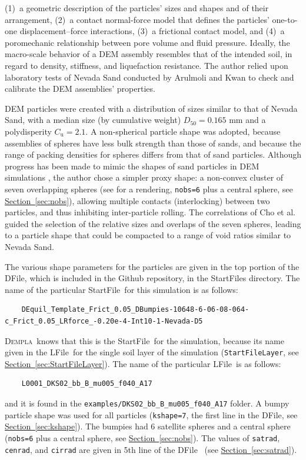 \documentclass[letterpaper,11pt]{article}
\newcommand{\Dempla}{\textsc{Dempla}}
\newcommand{\StartFile}{\textsf{StartFile}}
\newcommand{\DFile}{\textsf{DFile}}
\newcommand{\LFile}{\textsf{LFile}}
\begin{document}
(1)~a geometric description
of the particles' sizes and shapes and of their arrangement,
(2)~a contact normal-force model that defines the particles' one-to-one
displacement--force
interactions,
(3)~a frictional contact model, and
(4)~a poromechanic relationship
between pore volume and fluid pressure.
Ideally, the macro-scale behavior of a DEM assembly resembles
that of the intended soil, in regard to density, stiffness,
and liquefaction resistance.
The author relied upon laboratory tests of Nevada Sand conducted 
by Arulmoli \cite{Arulmoli1992a}
and Kwan \cite{Kwan:2015a}
to check and calibrate the DEM assemblies' properties.
%
\par
DEM particles were created with a distribution of sizes similar to that
of Nevada Sand, with a median size (by cumulative weight)
$D_{\text{50}}=\text{0.165~mm}$
and a polydisperity $C_{\text{u}}=\text{2.1}$.
A non-spherical particle shape was adopted,
because assemblies of spheres have less bulk strength than those of sands,
and because the range of packing densities for spheres differs from
that of sand particles.
Although progress has been made to mimic the shapes
of sand particles in DEM simulations \cite{Lim:2014a},
the author chose a simpler proxy shape:
a non-convex cluster of seven overlapping spheres
(see \cite{Kuhn:2014c} for a rendering,
\texttt{nobs=6} plus a central sphere,
see \hyperref[sec:nobs]{Section~\ref*{sec:nobs}}),
allowing multiple contacts (interlocking) between two particles,
and thus inhibiting inter-particle rolling.
The correlations of Cho et al. \cite{Cho:2006a} guided the selection of
the relative sizes and overlaps
of the seven spheres, leading to a particle shape that
could be compacted to a range of void ratios similar
to Nevada Sand.
\par
The various shape parameters for the particles
are given in the top portion
of the \DFile, which is included in the Github repository,
in the \textsf{StartFiles} directory.
The name of the particular \StartFile\ for this simulation
is as follows:
\begin{verbatim}
	DEquil_Template_Frict_0.05_DBumpies-10648-6-06-08-064-c_Frict_0.05_LRforce_-0.20e-4-Int10-1-Nevada-D5
\end{verbatim}
\Dempla\ knows that this is the \StartFile\ for the simulation,
because its name given in the \LFile\ for the single soil layer
of the simulation
(\texttt{StartFileLayer},
see \hyperref[sec:StartFileLayer]{Section~\ref*{sec:StartFileLayer}}).
The name of the particular \LFile\ is as follows:
\begin{verbatim}
	L0001_DKS02_bb_B_mu005_f040_A17
\end{verbatim}
and it is found in the \texttt{examples/DKS02\_bb\_B\_mu005\_f040\_A17}
folder.
A bumpy particle shape was used for all particles
(\texttt{kshape=7}, the first line in the \DFile,
see \hyperref[sec:kshape]{Section~\ref*{sec:kshape}}).
The bumpies had 6 satellite spheres and a central sphere
(\texttt{nobs=6} plus a central sphere,
see \hyperref[sec:nobs]{Section~\ref*{sec:nobs}}).
The values of \texttt{satrad}, \texttt{cenrad}, and \texttt{cirrad}
are given in 5th line of the \DFile\ %
(see \hyperref[sec:satrad]{Section~\ref*{sec:satrad}}).
\end{document}
